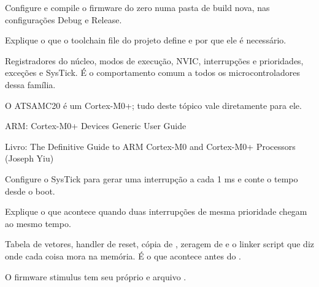 \begin{pratique}
  \item Configure e compile o firmware do zero numa pasta de build nova, nas configurações Debug e Release.
  \item Explique o que o toolchain file do projeto define e por que ele é necessário.
\end{pratique}


Registradores do núcleo, modos de execução, NVIC, interrupções e prioridades, exceções e SysTick. É o comportamento comum a todos os microcontroladores dessa família.

\begin{noproduto}
O ATSAMC20 é um Cortex-M0+; tudo deste tópico vale diretamente para ele.
\end{noproduto}

\begin{paraestudar}
  \item ARM: Cortex-M0+ Devices Generic User Guide
  \item Livro: The Definitive Guide to ARM Cortex-M0 and Cortex-M0+ Processors (Joseph Yiu)
\end{paraestudar}

\begin{pratique}
  \item Configure o SysTick para gerar uma interrupção a cada 1 ms e conte o tempo desde o boot.
  \item Explique o que acontece quando duas interrupções de mesma prioridade chegam ao mesmo tempo.
\end{pratique}

Tabela de vetores, handler de reset, cópia de , zeragem de  e o linker script que diz onde cada coisa mora na memória. É o que acontece antes do .

\begin{noproduto}
O firmware stimulus tem seu próprio  e arquivo .
\end{noproduto}

\begin{paraestudar}
  \item {}
\end{paraestudar}

